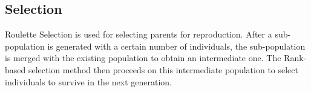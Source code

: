 \subsection{Selection}
Roulette Selection is used for selecting parents for reproduction. After a sub-population is generated with a certain number of individuals, the sub-population is merged with the existing population to obtain an intermediate one. The Rank-based selection method then proceeds on this intermediate population to select individuals to survive in the next generation.
